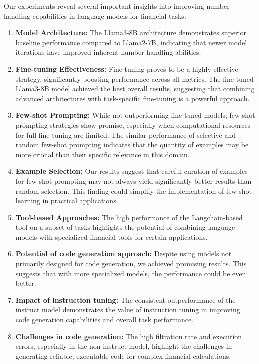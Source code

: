 \documentclass[logo,msc]{infthesis}           %
\begin{document}
Our experiments reveal several important insights into improving number handling capabilities in language models for financial tasks:
\begin{enumerate}
   
 \item \textbf{Model Architecture:} The Llama3-8B architecture demonstrates superior baseline performance compared to Llama2-7B, indicating that newer model iterations have improved inherent number handling abilities.
 \item \textbf{Fine-tuning Effectiveness:} Fine-tuning proves to be a highly effective strategy, significantly boosting performance across all metrics. The fine-tuned Llama3-8B model achieved the best overall results, suggesting that combining advanced architectures with task-specific fine-tuning is a powerful approach.
 \item \textbf{Few-shot Prompting:} While not outperforming fine-tuned models, few-shot prompting strategies show promise, especially when computational resources for full fine-tuning are limited. The similar performance of selective and random few-shot prompting indicates that the quantity of examples may be more crucial than their specific relevance in this domain.
 \item \textbf{Example Selection:} Our results suggest that careful curation of examples for few-shot prompting may not always yield significantly better results than random selection. This finding could simplify the implementation of few-shot learning in practical applications.
 \item \textbf{Tool-based Approaches:} The high performance of the Langchain-based tool on a subset of tasks highlights the potential of combining language models with specialized financial tools for certain applications.
  \item \textbf{Potential of code generation approach:} Despite using models not primarily designed for code generation, we achieved promising results. This suggests that with more specialized models, the performance could be even better.
  \item \textbf{Impact of instruction tuning:} The consistent outperformance of the instruct model demonstrates the value of instruction tuning in improving code generation capabilities and overall task performance.
  \item \textbf{Challenges in code generation:} The high filtration rate and execution errors, especially in the non-instruct model, highlight the challenges in generating reliable, executable code for complex financial calculations.

\end{enumerate}
\end{document}

